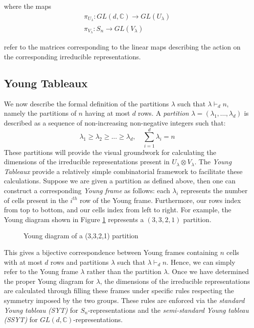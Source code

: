 \documentclass[11pt]{article}%
\begin{document}
\noindent where the maps
\begin{gather*}
  \pi_{U_{\lambda}}: GL(d, \mathbb{C}) \rightarrow GL(U_\lambda) \\ \pi_{V_{\lambda}}: S_n \rightarrow GL(V_\lambda)
\end{gather*}

\noindent refer to the matrices corresponding to the linear maps describing the action on the corresponding irreducible representations.

\subsection{Young Tableaux}
We now describe the formal definition of the partitions $\lambda$ such that $\lambda \vdash_d n$, namely the partitions of $n$ having at most $d$ rows. A \textit{partition} $\lambda = (\lambda_1,...,\lambda_d)$ is described as a sequence of non-increasing non-negative integers such that:
$$ \lambda_1 \geq \lambda_2 \geq ... \geq \lambda_d, \quad \sum_{i=1}^d \lambda_i = n $$
These partitions will provide the visual groundwork for calculating the dimensions of the irreducible representations present in $U_\lambda \otimes V_\lambda$.
The \textit{Young Tableaux} provide a relatively simple combinatorial framework to facilitate these calculations. Suppose we are given a partition as defined above, then one can construct a corresponding \textit{Young frame} as follows: each $\lambda_i$ represents the number of cells present in the $i^{th}$ row of the Young frame. Furthermore, our rows index from top to bottom, and our cells index from left to right. For example, the Young diagram shown in Figure \ref{fig:yd} represents a $(3,3,2,1)$ partition.

\begin{figure}[ht]
    \centering
    \caption{Young diagram of a (3,3,2,1) partition}
    \label{fig:yd}
\end{figure}

\noindent This gives a bijective correspondence between Young frames containing $n$ cells with at most $d$ rows and partitions $\lambda$ such that $\lambda \vdash_d n$. Hence, we can simply refer to the Young frame $\lambda$ rather than the partition $\lambda$.
 Once we have determined the proper Young diagram for $\lambda$, the dimensions of the irreducible representations are calculated through filling these frames under specific rules respecting the symmetry imposed by the two groups. These rules are enforced via the \textit{standard Young tableau (SYT)} for $S_n$-representations and the \textit{semi-standard Young tableau (SSYT)} for $GL(d, \mathbb{C})$-representations.
\end{document}
